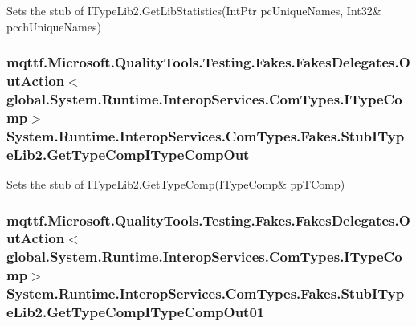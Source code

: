 Sets the stub of I\-Type\-Lib2.\-Get\-Lib\-Statistics(Int\-Ptr pc\-Unique\-Names, Int32\& pcch\-Unique\-Names)

\hypertarget{class_system_1_1_runtime_1_1_interop_services_1_1_com_types_1_1_fakes_1_1_stub_i_type_lib2_a0fb22c311adafff89de3c085499c76dd}{
\subsubsection[{Get\-Type\-Comp\-I\-Type\-Comp\-Out}]{\setlength{\rightskip}{0pt plus 5cm}mqttf.\-Microsoft.\-Quality\-Tools.\-Testing.\-Fakes.\-Fakes\-Delegates.\-Out\-Action$<$global.\-System.\-Runtime.\-Interop\-Services.\-Com\-Types.\-I\-Type\-Comp$>$ System.\-Runtime.\-Interop\-Services.\-Com\-Types.\-Fakes.\-Stub\-I\-Type\-Lib2.\-Get\-Type\-Comp\-I\-Type\-Comp\-Out}}\label{class_system_1_1_runtime_1_1_interop_services_1_1_com_types_1_1_fakes_1_1_stub_i_type_lib2_a0fb22c311adafff89de3c085499c76dd}


Sets the stub of I\-Type\-Lib2.\-Get\-Type\-Comp(I\-Type\-Comp\& pp\-T\-Comp)

\hypertarget{class_system_1_1_runtime_1_1_interop_services_1_1_com_types_1_1_fakes_1_1_stub_i_type_lib2_a9aed2c9872fd7d8eaa55c04a99b35c4d}{
\subsubsection[{Get\-Type\-Comp\-I\-Type\-Comp\-Out01}]{\setlength{\rightskip}{0pt plus 5cm}mqttf.\-Microsoft.\-Quality\-Tools.\-Testing.\-Fakes.\-Fakes\-Delegates.\-Out\-Action$<$global.\-System.\-Runtime.\-Interop\-Services.\-Com\-Types.\-I\-Type\-Comp$>$ System.\-Runtime.\-Interop\-Services.\-Com\-Types.\-Fakes.\-Stub\-I\-Type\-Lib2.\-Get\-Type\-Comp\-I\-Type\-Comp\-Out01}}\label{class_system_1_1_runtime_1_1_interop_services_1_1_com_types_1_1_fakes_1_1_stub_i_type_lib2_a9aed2c9872fd7d8eaa55c04a99b35c4d}



